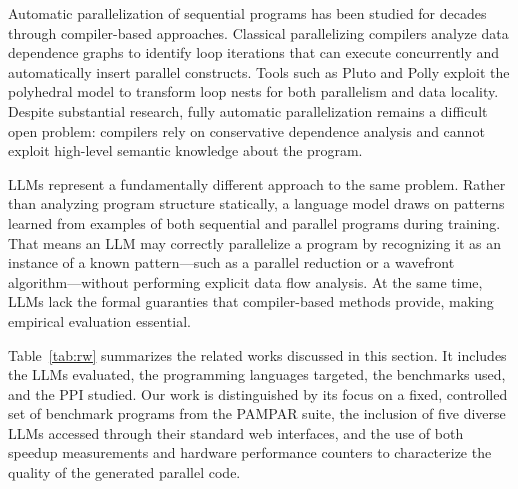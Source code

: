 \documentclass[conference]{IEEEtran}
\begin{document}

Automatic parallelization of sequential programs has been studied for decades through compiler-based approaches. 
Classical parallelizing compilers analyze data dependence graphs to identify loop iterations that can execute concurrently and automatically insert parallel constructs. 
Tools such as Pluto \cite{bondhugula2008pluto} and Polly \cite{grosser2012polly} exploit the polyhedral model to transform loop nests for both parallelism and data locality. 
Despite substantial research, fully automatic parallelization remains a difficult open problem: compilers rely on conservative dependence analysis and cannot exploit high-level semantic knowledge about the program.

LLMs represent a fundamentally different approach to the same problem. Rather than analyzing program structure statically, a language model draws on patterns learned from examples of both sequential and parallel programs during training. 
That means an LLM may correctly parallelize a program by recognizing it as an instance of a known pattern—such as a parallel reduction or a wavefront algorithm—without performing explicit data flow analysis. 
At the same time, LLMs lack the formal guaranties that compiler-based methods provide, making empirical evaluation essential.


Table~\ref{tab:rw} summarizes the related works discussed in this section. 
It includes the LLMs evaluated, the programming languages targeted, the benchmarks used, and the PPI studied. 
Our work is distinguished by its focus on a fixed, controlled set of benchmark programs from the PAMPAR suite, the inclusion of five diverse LLMs accessed through their standard web interfaces, and the use of both speedup measurements and hardware performance counters to characterize the quality of the generated parallel code.
\end{document}
